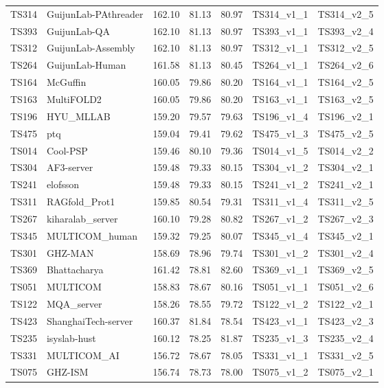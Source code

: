 \begin{longtable}{lllllll}
TS314 & GuijunLab-PAthreader & 162.10 & 81.13 & 80.97 & TS314\_v1\_1 & TS314\_v2\_5 \\ 
TS393 & GuijunLab-QA & 162.10 & 81.13 & 80.97 & TS393\_v1\_1 & TS393\_v2\_4 \\ 
TS312 & GuijunLab-Assembly & 162.10 & 81.13 & 80.97 & TS312\_v1\_1 & TS312\_v2\_5 \\ 
TS264 & GuijunLab-Human & 161.58 & 81.13 & 80.45 & TS264\_v1\_1 & TS264\_v2\_6 \\ 
TS164 & McGuffin & 160.05 & 79.86 & 80.20 & TS164\_v1\_1 & TS164\_v2\_5 \\ 
TS163 & MultiFOLD2 & 160.05 & 79.86 & 80.20 & TS163\_v1\_1 & TS163\_v2\_5 \\ 
TS196 & HYU\_MLLAB & 159.20 & 79.57 & 79.63 & TS196\_v1\_4 & TS196\_v2\_1 \\ 
TS475 & ptq & 159.04 & 79.41 & 79.62 & TS475\_v1\_3 & TS475\_v2\_5 \\ 
TS014 & Cool-PSP & 159.46 & 80.10 & 79.36 & TS014\_v1\_5 & TS014\_v2\_2 \\ 
TS304 & AF3-server & 159.48 & 79.33 & 80.15 & TS304\_v1\_2 & TS304\_v2\_1 \\ 
TS241 & elofsson & 159.48 & 79.33 & 80.15 & TS241\_v1\_2 & TS241\_v2\_1 \\ 
TS311 & RAGfold\_Prot1 & 159.85 & 80.54 & 79.31 & TS311\_v1\_4 & TS311\_v2\_5 \\ 
TS267 & kiharalab\_server & 160.10 & 79.28 & 80.82 & TS267\_v1\_2 & TS267\_v2\_3 \\ 
TS345 & MULTICOM\_human & 159.32 & 79.25 & 80.07 & TS345\_v1\_4 & TS345\_v2\_1 \\ 
TS301 & GHZ-MAN & 158.69 & 78.96 & 79.74 & TS301\_v1\_2 & TS301\_v2\_4 \\ 
TS369 & Bhattacharya & 161.42 & 78.81 & 82.60 & TS369\_v1\_1 & TS369\_v2\_5 \\ 
TS051 & MULTICOM & 158.83 & 78.67 & 80.16 & TS051\_v1\_1 & TS051\_v2\_6 \\ 
TS122 & MQA\_server & 158.26 & 78.55 & 79.72 & TS122\_v1\_2 & TS122\_v2\_1 \\ 
TS423 & ShanghaiTech-server & 160.37 & 81.84 & 78.54 & TS423\_v1\_1 & TS423\_v2\_3 \\ 
TS235 & isyslab-hust & 160.12 & 78.25 & 81.87 & TS235\_v1\_3 & TS235\_v2\_4 \\ 
TS331 & MULTICOM\_AI & 156.72 & 78.67 & 78.05 & TS331\_v1\_1 & TS331\_v2\_5 \\ 
TS075 & GHZ-ISM & 156.74 & 78.73 & 78.00 & TS075\_v1\_2 & TS075\_v2\_1 \\ 

\end{longtable}
